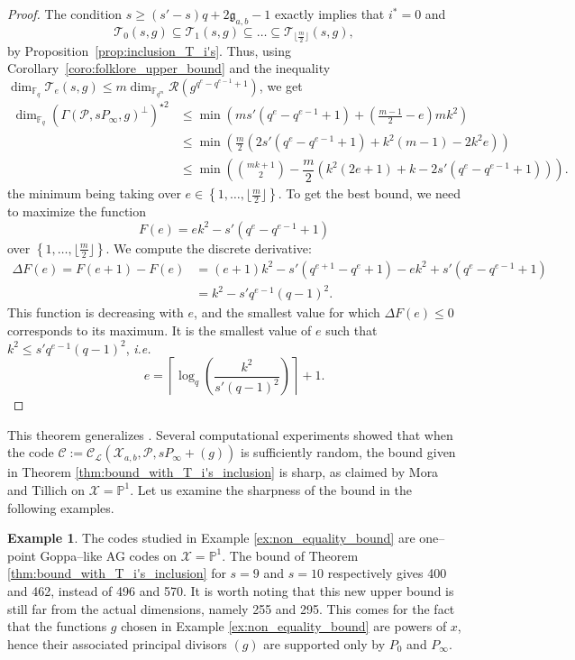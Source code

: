 \documentclass[a4paper]{amsart}
\theoremstyle{definition}
\newtheorem{example}[thm]{Example}
\theoremstyle{remark}
\newcommand{\calP}{\mathcal{P}}
\newcommand{\calL}{\mathcal{L}}
\newcommand{\calC}{\mathcal{C}}
\newcommand{\calR}{\mathcal{R}}
\newcommand{\calT}{\mathcal{T}}
\newcommand{\calX}{\mathcal{X}}
\newcommand{\fqm}{\mathbb{F}_{q^m}}
\newcommand{\fq}{\mathbb{F}_{q}}
\newcommand{\PP}{\mathbb{P}}
\newcommand{\set}[1]{\left\{#1\right\}}
\begin{document}
\begin{proof}
The condition $s \geq (s'-s)q+2\mathfrak{g}_{a,b}-1$ exactly implies that $i^*=0$ and $$\calT_0(s,g) \subseteq \calT_1(s,g) \subseteq \dots \subseteq \calT_{\lfloor \frac{m}{2}\rfloor}(s,g),$$ 
by Proposition~\ref{prop:inclusion_T_i's}. Thus, using Corollary~\ref{coro:folklore_upper_bound} and the inequality $\dim_{\fq}\calT_e(s,g) \leq m \dim_{\fqm} \calR(g^{q^e-q^{e-1}+1})$, we get
\begin{align*}
        \dim_{\fq} (\Gamma(\calP,sP_\infty,g)^{\perp})^{\star 2}
        & \leq \min \left(ms'(q^e-q^{e-1}+1) + \left( \frac{m-1}{2} -e \right)mk^2 \right)\\
        & \leq \min \left(\frac{m}{2}\left(2s'(q^e-q^{e-1}+1)+k^2(m-1)-2k^2e  \right)\right) \\
        & \leq \min\left(\binom{mk+1}{2} - \dfrac{m}{2}\left(k^2(2e+1)+k-2s'(q^e-q^{e-1}+1)\right)\right).
\end{align*}
the minimum being taking over $e \in \set{1,\dots,\lfloor \frac{m}{2} \rfloor}$. 
To get the best bound, we need to maximize the function
$$F(e) = ek^2-s'(q^e-q^{e-1}+1)$$
over $\set{1,\dots,\lfloor \frac{m}{2} \rfloor}$.
We compute the discrete derivative:
\begin{align*}
    \Delta F(e) = F(e+1)-F(e) &= (e+1)k^2- s'(q^{e+1}-q^e+1) - ek^2 + s'(q^e-q^{e-1}+1) \\
                              &= k^2 - s'q^{e-1}(q-1)^2.
\end{align*}
This function is decreasing with $e$, and the smallest value for which $\Delta F(e) \leq 0$ corresponds to its maximum. It is the smallest value of $e$ such that $k^2 \leq s'q^{e-1}(q-1)^2$, \emph{i.e.}
$$e =  \left\lceil \log_q\left(\dfrac{k^2}{s'(q-1)^2}\right)\right\rceil+1.$$
\end{proof}

This theorem generalizes \cite[Corollary 27]{MT21}. Several computational experiments showed that when the code $\calC:=\calC_{\calL}(\calX_{a,b},\calP,sP_\infty+(g))$ is sufficiently random, the bound given in Theorem \ref{thm:bound_with_T_i's_inclusion} is sharp, as claimed by Mora and Tillich \cite[Remark 28]{MT21} on ${\calX=\PP^1}$. Let us examine the sharpness of the bound in the following examples.

\begin{example}\label{ex:comp}
	The codes studied in Example \ref{ex:non_equality_bound} are one--point Goppa--like AG codes on ${\calX=\PP^1}$. The bound of Theorem \ref{thm:bound_with_T_i's_inclusion} for $s=9$ and $s=10$ respectively gives 400 and 462, instead of 496 and 570. It is worth noting that this new upper bound is still far from the actual dimensions, namely 255 and 295. This comes for the fact that the functions $g$ chosen in Example \ref{ex:non_equality_bound} are powers of $x$, hence their associated principal divisors $(g)$ are supported only by $P_0$ and $P_\infty$.
\end{example}
\end{document}
